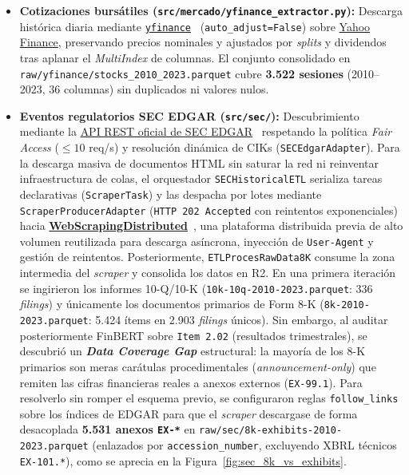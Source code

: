 \begin{itemize}
    \item \textbf{Cotizaciones bursátiles (\texttt{src/mercado/yfinance\_extractor.py}):} Descarga histórica diaria mediante \href{https://github.com/ranaroussi/yfinance}{\texttt{yfinance}}~\cite{aroussi_yfinance} (\texttt{auto\_adjust=False}) sobre \href{https://finance.yahoo.com/}{Yahoo Finance}, preservando precios nominales y ajustados por \textit{splits} y dividendos tras aplanar el \textit{MultiIndex} de columnas. El conjunto consolidado en \texttt{raw/yfinance/\allowbreak stocks\_2010\_2023.parquet} cubre \textbf{3.522 sesiones} (2010--2023, 36 columnas) sin duplicados ni valores nulos.

    \item \textbf{Eventos regulatorios SEC EDGAR (\texttt{src/sec/}):} Descubrimiento mediante la \href{https://www.sec.gov/search-filings/edgar-application-programming-interfaces}{API REST oficial de SEC EDGAR}~\cite{sec_edgar_api} respetando la política \textit{Fair Access} ($\le 10$ req/s) y resolución dinámica de CIKs (\texttt{SECEdgarAdapter}). Para la descarga masiva de documentos HTML sin saturar la red ni reinventar infraestructura de colas, el orquestador \texttt{SECHistoricalETL} serializa tareas declarativas (\texttt{ScraperTask}) y las despacha por lotes mediante \texttt{ScraperProducerAdapter} (\texttt{HTTP 202 Accepted} con reintentos exponenciales) hacia \href{https://github.com/ArturoCarrilloJimenez/WebScrapingDistributed}{\textbf{WebScrapingDistributed}}~\cite{carrillo2026webscrapingdistributed}, una plataforma distribuida previa de alto volumen reutilizada para descarga asíncrona, inyección de \texttt{User-Agent} y gestión de reintentos. Posteriormente, \texttt{ETLProcesRawData8K} consume la zona intermedia del \textit{scraper} y consolida los datos en R2. En una primera iteración se ingirieron los informes 10-Q/10-K (\texttt{10k-10q-2010-2023.parquet}: 336 \textit{filings}) y únicamente los documentos primarios de Form 8-K (\texttt{8k-2010-2023.parquet}: 5.424 ítems en 2.903 \textit{filings} únicos). Sin embargo, al auditar posteriormente FinBERT sobre \texttt{Item 2.02} (resultados trimestrales), se descubrió un \textbf{\textit{Data Coverage Gap}} estructural: la mayoría de los 8-K primarios son meras carátulas procedimentales (\textit{announcement-only}) que remiten las cifras financieras reales a anexos externos (\texttt{EX-99.1}). Para resolverlo sin romper el esquema previo, se configuraron reglas \texttt{follow\_links} sobre los índices de EDGAR para que el \textit{scraper} descargase de forma desacoplada \textbf{5.531 anexos \texttt{EX-*}} en \texttt{raw/sec/\allowbreak 8k-exhibits-2010-2023.parquet} (enlazados por \texttt{accession\_number}, excluyendo XBRL técnicos \texttt{EX-101.*}), como se aprecia en la Figura~\ref{fig:sec_8k_vs_exhibits}.


\end{itemize}
